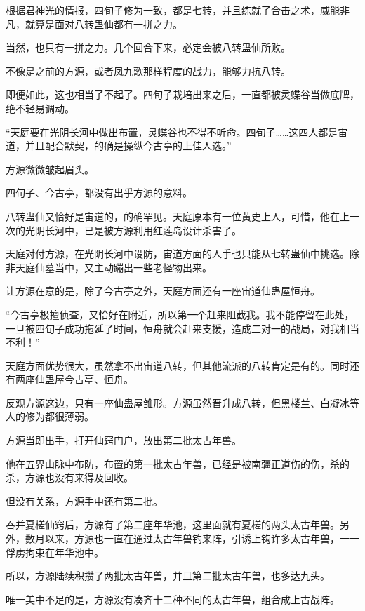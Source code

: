 
\begin{this_body}



根据君神光的情报，四旬子修为一致，都是七转，并且练就了合击之术，威能非凡，就算是面对八转蛊仙都有一拼之力。

当然，也只有一拼之力。几个回合下来，必定会被八转蛊仙所败。

不像是之前的方源，或者凤九歌那样程度的战力，能够力抗八转。

即便如此，这也相当了不起了。四旬子栽培出来之后，一直都被灵蝶谷当做底牌，绝不轻易调动。

“天庭要在光阴长河中做出布置，灵蝶谷也不得不听命。四旬子……这四人都是宙道，并且配合默契，的确是操纵今古亭的上佳人选。”

方源微微皱起眉头。

四旬子、今古亭，都没有出乎方源的意料。

八转蛊仙又恰好是宙道的，的确罕见。天庭原本有一位黄史上人，可惜，他在上一次的光阴长河中，已是被方源利用红莲岛设计杀害了。

天庭对付方源，在光阴长河中设防，宙道方面的人手也只能从七转蛊仙中挑选。除非天庭仙墓当中，又主动蹦出一些老怪物出来。

让方源在意的是，除了今古亭之外，天庭方面还有一座宙道仙蛊屋恒舟。

“今古亭极擅侦查，又恰好在附近，所以第一个赶来阻截我。我不能停留在此处，一旦被四旬子成功拖延了时间，恒舟就会赶来支援，造成二对一的战局，对我相当不利！”

天庭方面优势很大，虽然拿不出宙道八转，但其他流派的八转肯定是有的。同时还有两座仙蛊屋今古亭、恒舟。

反观方源这边，只有一座仙蛊屋雏形。方源虽然晋升成八转，但黑楼兰、白凝冰等人的修为都很薄弱。

方源当即出手，打开仙窍门户，放出第二批太古年兽。

他在五界山脉中布防，布置的第一批太古年兽，已经是被南疆正道伤的伤，杀的杀，方源也没有来得及回收。

但没有关系，方源手中还有第二批。

吞并夏槎仙窍后，方源有了第二座年华池，这里面就有夏槎的两头太古年兽。另外，数月以来，方源也一直在通过太古年兽钓来阵，引诱上钩许多太古年兽，一一俘虏拘束在年华池中。

所以，方源陆续积攒了两批太古年兽，并且第二批太古年兽，也多达九头。

唯一美中不足的是，方源没有凑齐十二种不同的太古年兽，组合成上古战阵。


\end{this_body}
